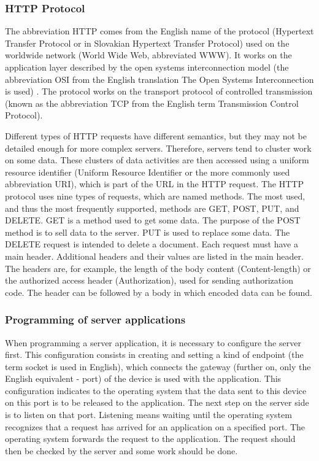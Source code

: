 \documentclass[
  biblatex = false,
  language=english,
  figures=false,
  sourcecodes,
  glossaries,
  index
]{kidiplom}
\begin{document}
\subsubsection{HTTP Protocol}
The abbreviation HTTP comes from the English name of the protocol (Hypertext Transfer Protocol or in Slovakian Hypertext Transfer Protocol) used on the worldwide network (World Wide Web, abbreviated WWW). It works on the application layer described by the open systems interconnection model (the abbreviation OSI from the English translation The Open Systems Interconnection is used) \cite{bib1}. The protocol works on the transport protocol of controlled transmission (known as the abbreviation TCP from the English term Transmission Control Protocol).

Different types of HTTP requests have different semantics, but they may not be detailed enough for more complex servers. Therefore, servers tend to cluster work on some data. These clusters of data activities are then accessed using a uniform resource identifier (Uniform Resource Identifier or the more commonly used abbreviation URI), which is part of the URL in the HTTP request. The HTTP protocol uses nine types of requests, which are named methods. The most used, and thus the most frequently supported, methods are GET, POST, PUT, and DELETE. GET is a method used to get some data. The purpose of the POST method is to sell data to the server. PUT is used to replace some data. The DELETE request is intended to delete a document.
Each request must have a main header. Additional headers and their values are listed in the main header. The headers are, for example, the length of the body content (Content-length) or the authorized access header (Authorization), used for sending authorization code. The header can be followed by a body in which encoded data can be found.

\subsubsection{Programming of server applications}
When programming a server application, it is necessary to configure the server first. This configuration consists in creating and setting a kind of endpoint (the term socket is used in English), which connects the gateway (further on, only the English equivalent - port) of the device is used with the application. This configuration indicates to the operating system that the data sent to this device on this port is to be released to the application. The next step on the server side is to listen on that port. Listening means waiting until the operating system recognizes that a request has arrived for an application on a specified port. The operating system forwards the request to the application. The request should then be checked by the server and some work should be done. 
\end{document}
